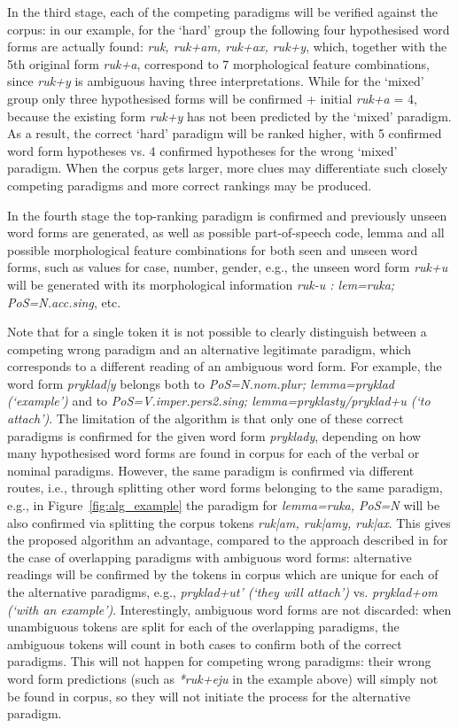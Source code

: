 \documentclass[11pt,a4paper]{article}
\begin{document}
In the third stage, each of the competing paradigms will be verified against the corpus: in our example, for the `hard' group the following four hypothesised word forms are actually found: \emph{ruk, ruk+am, ruk+ax, ruk+y}, which, together with the 5th original form \emph{ruk+a}, correspond to 7 morphological feature combinations, since \emph{ruk+y} is ambiguous having three interpretations. While for the `mixed' group only three hypothesised forms will be confirmed + initial \emph{ruk+a} = 4, because the existing form \emph{ruk+y} has not been predicted by the `mixed' paradigm. As a result, the correct `hard' paradigm will be ranked higher, with 5 confirmed word form hypotheses vs. 4 confirmed hypotheses for the wrong `mixed' paradigm. When the corpus gets larger, more clues may differentiate such closely competing paradigms and more correct rankings may be produced.

In the fourth stage the top-ranking paradigm is confirmed and previously unseen word forms are generated, as well as possible part-of-speech code, lemma and all possible morphological feature combinations for both seen and unseen word forms, such as values for case, number, gender, e.g., the unseen word form \emph{ruk+u} will be generated with its morphological information \emph{ruk-u : lem=ruka; PoS=N.acc.sing}, etc.

Note that for a single token it is not possible to clearly distinguish between a competing wrong paradigm and an alternative legitimate paradigm, which corresponds to a different reading of an ambiguous word form. For example, the word form \emph{pryklad|y} belongs both to \emph{PoS=N.nom.plur; lemma=pryklad (`example')} and to \emph{PoS=V.imper.pers2.sing; lemma=pryklasty/pryklad+u (`to attach')}. The limitation of the algorithm is that only one of these correct paradigms is confirmed for the given word form \emph{pryklady}, depending on how many hypothesised word forms are found in corpus for each of the verbal or nominal paradigms. However, the same paradigm is confirmed via different routes, i.e., through splitting other word forms belonging to the same paradigm, e.g., in Figure~\ref{fig:alg_example} the paradigm for \emph{lemma=ruka, PoS=N} will be also confirmed via splitting the corpus tokens \emph{ruk|am, ruk|amy, ruk|ax}. This gives the proposed algorithm an advantage, compared to the approach described in \cite{ahlberg2015paradigm} for the case of overlapping paradigms with ambiguous word forms: alternative readings will be confirmed by the tokens in corpus which are unique for each of the alternative paradigms, e.g., \emph{pryklad+ut' (`they will attach')} vs. \emph{pryklad+om (`with an example')}. Interestingly, ambiguous word forms are not discarded: when unambiguous tokens are split for each of the overlapping paradigms, the ambiguous tokens will count in both cases to confirm both of the correct paradigms. This will not happen for competing wrong paradigms: their wrong word form predictions (such as \emph{*ruk+eju} in the example above)  will simply not be found in corpus, so they will not initiate the process for the alternative paradigm.
\end{document}
